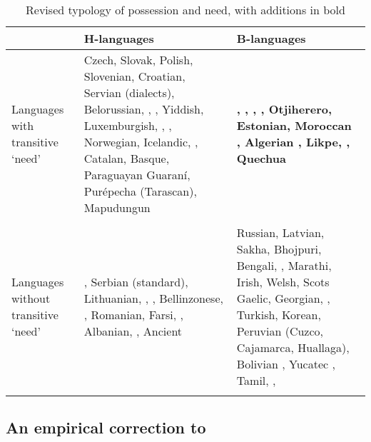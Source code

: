 \documentclass[output=paper,
modfonts
]{langscibook}
\begin{document}
\begin{table} 
\begin{tabularx}{\textwidth}{p{1in}QQ}
\lsptoprule
& H-languages & B-languages\\
\midrule
Languages with transitive `need' & Czech, Slovak, Polish, Slovenian,
Croatian, Servian (dialects), Belorussian, , , Yiddish,
Luxemburgish, , , Norwegian, Icelandic, , Catalan,
Basque, Paraguayan Guaran\'i, Pur\'epecha (Tarascan), Mapudungun &
\textbf{, , , , Otjiherero, Estonian, Moroccan
  , Algerian , Likpe, ,  Quechua}\\
&&\\
Languages without transitive `need' & , Serbian (standard), Lithuanian, , , Bellinzonese, , Romanian, Farsi, , Albanian, , Ancient  & Russian, Latvian, Sakha, Bhojpuri, Bengali, , Marathi, Irish, Welsh, Scots Gaelic, Georgian, , Turkish, Korean, Peruvian  (Cuzco, Cajamarca, Huallaga), Bolivian , Yucatec , Tamil, , \\
\lspbottomrule
\end{tabularx}

\caption{Revised typology of possession and need, with additions in bold}\label{tab:halpert:newchart} 
\end{table}



\subsection{An empirical correction to \citet{Harves:2012}}
\end{document}
